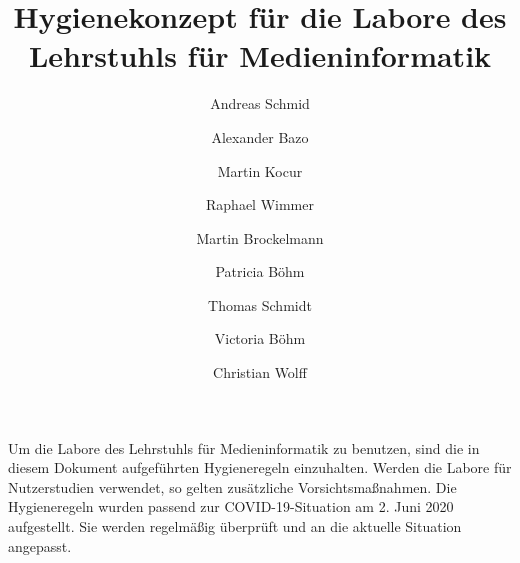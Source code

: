 \documentclass[hidelinks,12pt]{extarticle}
\title{
    \bfseries
    \sffamily
    Hygienekonzept für die Labore des Lehrstuhls für Medieninformatik
}
\author{Andreas Schmid}
\author{Alexander Bazo}
\author{Martin Kocur}
\author{Raphael Wimmer}
\author{Martin Brockelmann}
\author{Patricia Böhm}
\author{Thomas Schmidt}
\author{Victoria Böhm}
\author{Christian Wolff}
\affil{Lehrstuhl für Medieninformatik, Universität Regensburg}
\begin{document}
\onehalfspacing
\maketitle

\noindent
Um die Labore des Lehrstuhls für Medieninformatik zu benutzen, sind die in diesem Dokument aufgeführten Hygieneregeln einzuhalten.
Werden die Labore für Nutzerstudien verwendet, so gelten zusätzliche Vorsichtsmaßnahmen.
Die Hygieneregeln wurden passend zur COVID-19-Situation am 2. Juni 2020 aufgestellt.
Sie werden regelmäßig überprüft und an die aktuelle Situation angepasst.

\newpage
\tableofcontents 














\end{document}
